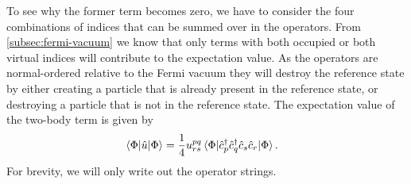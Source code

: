        To see why the former term becomes zero, we have to consider the four
        combinations of indices that can be summed over in the operators.
        From \autoref{subsec:fermi-vacuum} we know that only terms with both
        occupied or both virtual indices will contribute to the expectation
        value.
        As the operators are normal-ordered relative to the Fermi vacuum they
        will destroy the reference state by either creating a particle that is
        already present in the reference state, or destroying a particle that is
        not in the reference state.
        The expectation value of the two-body term is given by
        \begin{align}
            \mel*{\Phi}{\hat{u}}{\Phi}
            &=
            \frac{1}{4}u^{pq}_{rs}
            \mel*{\Phi}{\hat{c}_{p}^{\dagger}\hat{c}_{q}^{\dagger}\hat{c}_{s}\hat{c}_{r}}{\Phi}.
        \end{align}
        For brevity, we will only write out the operator strings.
